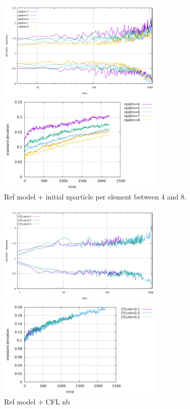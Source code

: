\begin{center}
\includegraphics[width=8cm]{python_codes/fieldstone_30/results_solcx/markercount_npd}
\includegraphics[width=8cm]{python_codes/fieldstone_30/results_solcx/stdev_npd}\\
{\captionfont Ref model + initial nparticle per element between 4 and 8.}
\end{center}

\begin{center}
\includegraphics[width=8cm]{python_codes/fieldstone_30/results_solcx/markercount_cflnb}
\includegraphics[width=8cm]{python_codes/fieldstone_30/results_solcx/stdev_cflnb}\\
{\captionfont Ref model + CFL nb}
\end{center}

